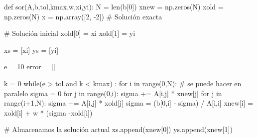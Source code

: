 \documentclass[
  letterpaper,
  DIV=11,
  numbers=noendperiod]{scrreprt}
\newenvironment{Shaded}{\begin{snugshade}}{\end{snugshade}}
\newcommand{\BuiltInTok}[1]{\textcolor[rgb]{0.00,0.23,0.31}{#1}}
\newcommand{\CommentTok}[1]{\textcolor[rgb]{0.37,0.37,0.37}{#1}}
\newcommand{\ControlFlowTok}[1]{\textcolor[rgb]{0.00,0.23,0.31}{#1}}
\newcommand{\DecValTok}[1]{\textcolor[rgb]{0.68,0.00,0.00}{#1}}
\newcommand{\KeywordTok}[1]{\textcolor[rgb]{0.00,0.23,0.31}{#1}}
\newcommand{\NormalTok}[1]{\textcolor[rgb]{0.00,0.23,0.31}{#1}}
\newcommand{\OperatorTok}[1]{\textcolor[rgb]{0.37,0.37,0.37}{#1}}
\begin{document}
\begin{Shaded}
\begin{Highlighting}[]
\KeywordTok{def}\NormalTok{ sor(A,b,tol,kmax,w,xi,yi):}
\NormalTok{    N }\OperatorTok{=} \BuiltInTok{len}\NormalTok{(b[}\DecValTok{0}\NormalTok{])}
\NormalTok{    xnew }\OperatorTok{=}\NormalTok{ np.zeros(N)}
\NormalTok{    xold }\OperatorTok{=}\NormalTok{ np.zeros(N)}
\NormalTok{    x }\OperatorTok{=}\NormalTok{ np.array([}\DecValTok{2}\NormalTok{, }\OperatorTok{{-}}\DecValTok{2}\NormalTok{]) }\CommentTok{\# Solución exacta}

    \CommentTok{\# Solución inicial}
\NormalTok{    xold[}\DecValTok{0}\NormalTok{] }\OperatorTok{=}\NormalTok{ xi}
\NormalTok{    xold[}\DecValTok{1}\NormalTok{] }\OperatorTok{=}\NormalTok{ yi}

\NormalTok{    xs }\OperatorTok{=}\NormalTok{ [xi]}
\NormalTok{    ys }\OperatorTok{=}\NormalTok{ [yi]}
    
\NormalTok{    e }\OperatorTok{=} \DecValTok{10}
\NormalTok{    error }\OperatorTok{=}\NormalTok{ [] }
    
\NormalTok{    k }\OperatorTok{=} \DecValTok{0}
    \ControlFlowTok{while}\NormalTok{(e }\OperatorTok{\textgreater{}}\NormalTok{ tol }\KeywordTok{and}\NormalTok{ k }\OperatorTok{\textless{}}\NormalTok{ kmax) :}
        \ControlFlowTok{for}\NormalTok{ i }\KeywordTok{in} \BuiltInTok{range}\NormalTok{(}\DecValTok{0}\NormalTok{,N): }\CommentTok{\# se puede hacer en paralelo}
\NormalTok{            sigma }\OperatorTok{=} \DecValTok{0}
            \ControlFlowTok{for}\NormalTok{ j }\KeywordTok{in} \BuiltInTok{range}\NormalTok{(}\DecValTok{0}\NormalTok{,i):}
\NormalTok{                sigma }\OperatorTok{+=}\NormalTok{ A[i,j] }\OperatorTok{*}\NormalTok{ xnew[j]}
            \ControlFlowTok{for}\NormalTok{ j }\KeywordTok{in} \BuiltInTok{range}\NormalTok{(i}\OperatorTok{+}\DecValTok{1}\NormalTok{,N):}
\NormalTok{                sigma }\OperatorTok{+=}\NormalTok{ A[i,j] }\OperatorTok{*}\NormalTok{ xold[j]                }
\NormalTok{            sigma }\OperatorTok{=}\NormalTok{ (b[}\DecValTok{0}\NormalTok{,i] }\OperatorTok{{-}}\NormalTok{ sigma) }\OperatorTok{/}\NormalTok{ A[i,i]}
\NormalTok{            xnew[i] }\OperatorTok{=}\NormalTok{ xold[i] }\OperatorTok{+}\NormalTok{ w }\OperatorTok{*}\NormalTok{ (sigma }\OperatorTok{{-}}\NormalTok{xold[i])}
            
        \CommentTok{\# Almacenamos la solución actual}
\NormalTok{        xs.append(xnew[}\DecValTok{0}\NormalTok{])}
\NormalTok{        ys.append(xnew[}\DecValTok{1}\NormalTok{])}
        

\end{Highlighting}
\end{Shaded}
\end{document}
